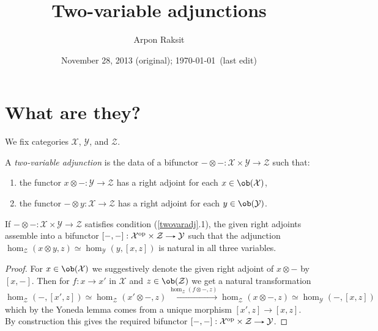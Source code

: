 


\title{Two-variable adjunctions}
\author{Arpon Raksit}
\date{November 28, 2013 (original); \today\ (last edit)}


\maketitle
\thispagestyle{fancy}


\renewcommand{\X}{\mathcal{X}}
\renewcommand{\Y}{\mathcal{Y}}
\renewcommand{\Z}{\mathcal{Z}}
\renewcommand{\C}{\mathcal{C}}


\section{What are they?}

\begin{notation}
  We fix categories $\X$, $\Y$, and $\Z$.
\end{notation}

\begin{definition}
  \label{twovaradj}
  A \emph{two-variable adjunction} is the data of a bifunctor $-
  \otimes - : \X \times \Y \to \Z$ such that:
  \begin{enumerate}
  \item the functor $x \otimes - : \Y \to \Z$ has a right adjoint for
    each $x \in \ob(\X)$,
  \item the functor $- \otimes y : \X \to \Z$ has a right adjoint for
    each $y \in \ob(\Y)$.
  \end{enumerate}
\end{definition}

\begin{lemma}
  \label{bifunctor-one}
  If $- \otimes - : \X \times \Y \to \Z$ satisfies condition
  (\ref{twovaradj}.1), the given right adjoints assemble into a
  bifunctor $[-,-] : \X^\op \times \Z \to \Y$ such that the adjunction
  $\hom_\Z(x \otimes y, z) \simeq \hom_\Y(y, [x,z])$ is natural in all
  three variables.
\end{lemma}

\begin{proof}
  For $x \in \ob(\X)$ we suggestively denote the given right adjoint
  of $x \otimes -$ by $[x,-]$. Then for $f : x \to x'$ in $\X$ and $z
  \in \ob(\Z)$ we get a natural transformation
  \[
    \hom_\Z(-, [x',z]) \simeq \hom_\Z(x' \otimes -, z)
    \xrightarrow{\hom_\Z(f \otimes -,z)} \hom_\Z(x \otimes -, z)
    \simeq \hom_\Y(-, [x,z])
  \]
  which by the Yoneda lemma comes from a unique morphism $[x',z] \to
  [x,z]$. By construction this gives the required bifunctor $[-,-] :
  \X^\op \times \Z \to \Y$.
\end{proof}

